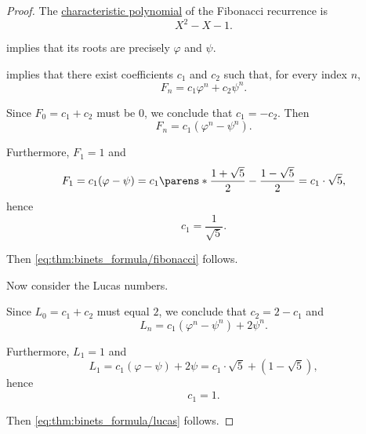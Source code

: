 \begin{proof}
  The \hyperref[def:linear_recurrence_characteristic_polynomial]{characteristic polynomial} of the Fibonacci recurrence is
  \begin{equation*}
    X^2 - X - 1.
  \end{equation*}

   implies that its roots are precisely \( \varphi \) and \( \psi \).

    implies that there exist coefficients \( c_1 \) and \( c_2 \) such that, for every index \( n \),
  \begin{equation*}
    F_n = c_1 \varphi^n + c_2 \psi^n.
  \end{equation*}

  Since \( F_0 = c_1 + c_2 \) must be \( 0 \), we conclude that \( c_1 = -c_2 \). Then
  \begin{equation*}
    F_n = c_1 (\varphi^n - \psi^n).
  \end{equation*}

  Furthermore, \( F_1 = 1 \) and
  \begin{equation*}
    F_1 = c_1 (\varphi - \psi) = c_1 \parens*{ \frac {1 + \sqrt 5} 2 - \frac {1 - \sqrt 5} 2 } = c_1 \cdot \sqrt 5,
  \end{equation*}
  hence
  \begin{equation*}
    c_1 = \frac 1 {\sqrt 5}.
  \end{equation*}

  Then \eqref{eq:thm:binets_formula/fibonacci} follows.

   Now consider the Lucas numbers.

  Since \( L_0 = c_1 + c_2 \) must equal \( 2 \), we conclude that \( c_2 = 2 - c_1 \) and
  \begin{equation*}
    L_n = c_1 (\varphi^n - \psi^n) + 2 \psi^n.
  \end{equation*}

  Furthermore, \( L_1 = 1 \) and
  \begin{equation*}
    L_1 = c_1 (\varphi - \psi) + 2 \psi = c_1 \cdot \sqrt 5 + (1 - \sqrt 5),
  \end{equation*}
  hence
  \begin{equation*}
    c_1 = 1.
  \end{equation*}

  Then \eqref{eq:thm:binets_formula/lucas} follows.
\end{proof}
